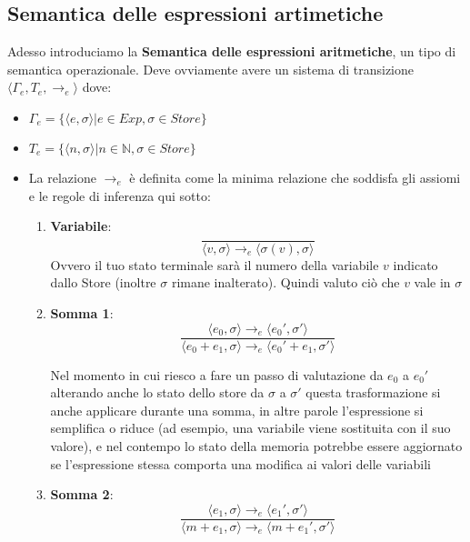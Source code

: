 \subsection{Semantica delle espressioni artimetiche}
Adesso introduciamo la \textbf{Semantica delle espressioni aritmetiche}, un tipo di semantica operazionale. Deve ovviamente avere un sistema di transizione $\langle \Gamma_e, T_e, \rightarrow_e \rangle$ dove:
\begin{itemize}
    \item $\Gamma_e = \{ \langle e, \sigma \rangle | e \in Exp, \sigma\in Store\}$
    \item $T_e = \{ \langle n, \sigma \rangle | n \in \mathbb{N}, \sigma\in Store\}$
    \item La relazione $\rightarrow_e$ è definita come la minima relazione che soddisfa gli assiomi e le regole di inferenza qui sotto:
    \begin{enumerate}
        \item \textbf{Variabile}:
        \[
        \frac{}{\langle v, \sigma \rangle \rightarrow_e \langle \sigma(v), \sigma \rangle}    
        \]
        Ovvero il tuo stato terminale sarà il numero della variabile $v$ indicato dallo Store (inoltre $\sigma$ rimane inalterato). Quindi valuto ciò che $v$ vale in $\sigma$
        \item \textbf{Somma 1}:
        \[
            \frac{\langle e_0, \sigma \rangle \rightarrow_e \langle e_0', \sigma' \rangle}{\langle e_0 + e_1, \sigma \rangle \rightarrow_e \langle e_0' + e_1, \sigma' \rangle}
        \]

        Nel momento in cui riesco a fare un passo di valutazione da $e_0$ a $e_0'$ alterando anche lo stato dello store da $\sigma$ a $\sigma'$ questa trasformazione si anche applicare durante una somma, in altre parole l’espressione si semplifica o riduce (ad esempio, una variabile viene sostituita con il suo valore), e nel contempo lo stato della memoria potrebbe essere aggiornato se l’espressione stessa comporta una modifica ai valori delle variabili

        \item \textbf{Somma 2}:
        \[
            \frac{\langle e_1, \sigma \rangle \rightarrow_e \langle e_1', \sigma' \rangle}{\langle m + e_1, \sigma \rangle \rightarrow_e \langle m + e_1', \sigma' \rangle}
           
\]
\end{enumerate}
\end{itemize}
